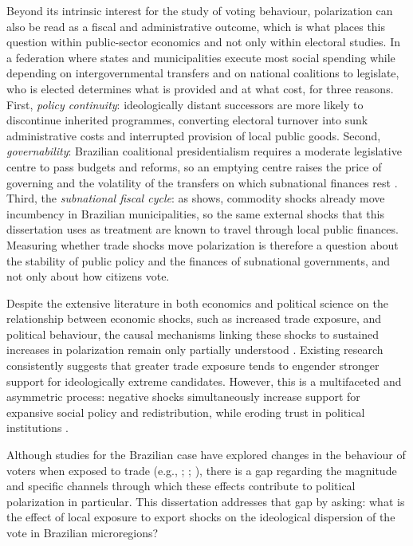 \documentclass[
	11pt,				%
	oneside,			%
	a4paper,			%
	english,			%
	english				%
	]{abntex2ppgsi}
\theoremstyle{plain}
\theoremstyle{remark}
\theoremstyle{plain}%
\theoremstyle{remark}%
\begin{document}
Beyond its intrinsic interest for the study of voting behaviour, polarization can also be read as a fiscal and administrative outcome, which is what places this question within public-sector economics and not only within electoral studies. In a federation where states and municipalities execute most social spending while depending on intergovernmental transfers and on national coalitions to legislate, who is elected determines what is provided and at what cost, for three reasons. First, \emph{policy continuity}: ideologically distant successors are more likely to discontinue inherited programmes, converting electoral turnover into sunk administrative costs and interrupted provision of local public goods. Second, \emph{governability}: Brazilian coalitional presidentialism requires a moderate legislative centre to pass budgets and reforms, so an emptying centre raises the price of governing and the volatility of the transfers on which subnational finances rest \cite{hunter,ZUCCO,melloespektor2018}. Third, the \emph{subnational fiscal cycle}: as  shows, commodity shocks already move incumbency in Brazilian municipalities, so the same external shocks that this dissertation uses as treatment are known to travel through local public finances. Measuring whether trade shocks move polarization is therefore a question about the stability of public policy and the finances of subnational governments, and not only about how citizens vote.

Despite the extensive literature in both economics and political science on the relationship between economic shocks, such as increased trade exposure, and political behaviour, the causal mechanisms linking these shocks to sustained increases in polarization remain only partially understood \cite{Autor}. Existing research consistently suggests that greater trade exposure tends to engender stronger support for ideologically extreme candidates. However, this is a multifaceted and asymmetric process: negative shocks simultaneously increase support for expansive social policy and redistribution, while eroding trust in political institutions \cite{Margalit}.

Although studies for the Brazilian case have explored changes in the behaviour of voters when exposed to trade (e.g., ; ; ), there is a gap regarding the magnitude and specific channels through which these effects contribute to political polarization in particular. This dissertation addresses that gap by asking: what is the effect of local exposure to export shocks on the ideological dispersion of the vote in Brazilian microregions?
\end{document}
